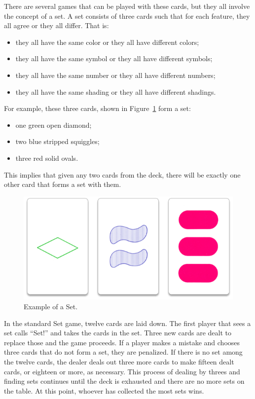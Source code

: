 \documentclass[11pt,a4paper,reqno]{report}
\numberwithin{equation}{section}
\begin{document}
There are several games that can be played with these cards, but they all involve the concept of a set. A set consists of three cards such that for each feature, they all agree or they all differ. That is:
\begin{itemize}
\item they all have the same color or they all have different colors;
\item they all have the same symbol or they all have different symbols;
\item they all have the same number or they all have different numbers;
\item they all have the same shading or they all have different shadings.
\end{itemize}
For example, these three cards, shown in Figure~\ref{set} form a set:
\begin{itemize}
\item one green open diamond;
\item two blue stripped squiggles;
\item three red solid ovals.
\end{itemize}
This implies that given any two cards from the deck, there will be exactly one other card that forms a set with them.

\begin{figure}[htbp]
\begin{center}
\includegraphics[scale=0.4]{set.png}
\caption{Example of a Set.}
\label{set}
\end{center}
\end{figure}

In the standard Set game, twelve cards are laid down. The first player that sees a set calls ``Set!'' and takes the cards in the set. Three new cards are dealt to replace those and the game proceeds. If a player makes a mistake and chooses three cards that do not form a set, they are penalized. If there is no set among the twelve cards, the dealer deals out three more cards to make fifteen dealt cards, or eighteen or more, as necessary. This process of dealing by threes and finding sets continues until the deck is exhausted and there are no more sets on the table. At this point, whoever has collected the most sets wins.
\end{document}
